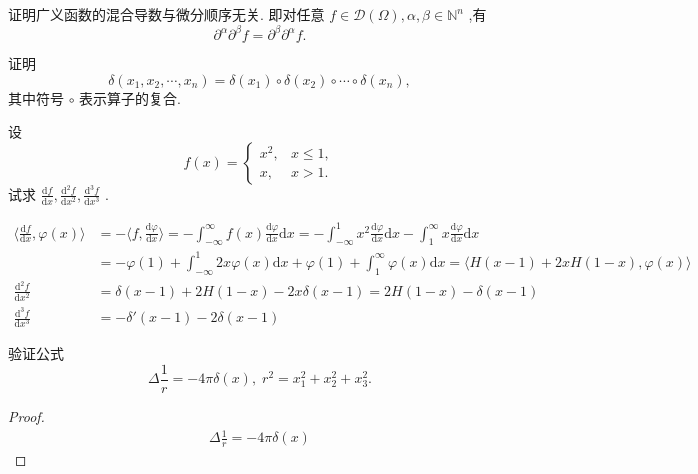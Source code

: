 \documentclass[lang=cn,newtx,10pt,scheme=chinese,thmcnt=chapter]{elegantbook}
\newcommand{\dif}{\mathrm{d}}
\begin{document}
\begin{problemset}
  \item 证明广义函数的混合导数与微分顺序无关. 即对任意 \(f \in  \mathcal{D}\left( \Omega \right) ,\alpha ,\beta  \in  {\mathbb{N}}^{n}\) ,有
\begin{equation*}
  {\partial }^{\alpha }{\partial }^{\beta }f = {\partial }^{\beta }{\partial }^{\alpha }f.
  \end{equation*}
  \item 证明
\begin{equation*}
  \delta \left( {{x}_{1},{x}_{2},\cdots ,{x}_{n}}\right)  = \delta \left( {x}_{1}\right)  \circ  \delta \left( {x}_{2}\right)  \circ  \cdots  \circ  \delta \left( {x}_{n}\right),
  \end{equation*}
  其中符号 \(\circ\) 表示算子的复合.

  \item 设
  \begin{equation*}
  f\left( x\right)  = \left\{  
  \begin{array}{ll} 
  {x}^{2}, & x \leqslant  1, \\  
  x, & x > 1.
  \end{array}\right.
  \end{equation*}
  试求 \(\frac{\dif f}{\dif x},\frac{{\dif}^{2}f}{\dif {x}^{2}},\frac{{\dif}^{3}f}{\dif{x}^{3}}\) .
\begin{solution}
    \begin{equation*}
        \begin{aligned}
          \langle  \frac{\dif f}{\dif x},\varphi(x)\rangle&=-\langle f, \frac{\dif \varphi}{\dif x}\rangle=-\int_{-\infty}^\infty f(x)\frac{\dif \varphi}{\dif x}\dif{x}=-\int_{-\infty}^1 x^2\frac{\dif \varphi}{\dif x}\dif{x}-\int_{1}^\infty x\frac{\dif \varphi}{\dif x}\dif{x}\\
          &= -\varphi(1)+\int_{-\infty}^1 2x\varphi(x)\dif{x}+\varphi(1)+\int_{1}^\infty \varphi(x)\dif x=\langle H(x-1)+2xH(1-x),\varphi(x)\rangle
          \\
        \frac{{\dif}^{2}f}{\dif {x}^{2}}  &=\delta(x-1)+2H(1-x)-2x\delta(x-1) =2H(1-x)-\delta(x-1)         \\
        \frac{{\dif}^{3}f}{\dif {x}^{3}}  &=-\delta'(x-1)-2\delta(x-1)
        \end{aligned}
    \end{equation*}
\end{solution}
  \item 验证公式\begin{equation*}
  \Delta \frac{1}{r} =  - {4\pi \delta }\left( x\right),\;{r}^{2} = {x}_{1}^{2} + {x}_{2}^{2} + {x}_{3}^{2}.
  \end{equation*}
\begin{proof}
    \begin{equation*}
\begin{aligned}
\Delta\frac{1}{r}=-4\pi \delta(x)
\end{aligned}
  \end{equation*}
  

\end{proof}
\end{problemset}
\end{document}

